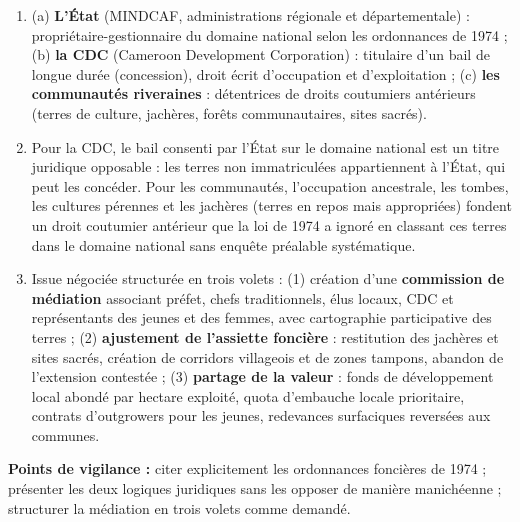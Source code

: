 \documentclass[11pt]{article}
\begin{document}
\begin{corrige}
\begin{enumerate}
    \item (a) \textbf{L'État} (MINDCAF, administrations régionale et départementale) : propriétaire-gestionnaire du domaine national selon les ordonnances de 1974 ; (b) \textbf{la CDC} (Cameroon Development Corporation) : titulaire d'un bail de longue durée (concession), droit écrit d'occupation et d'exploitation ; (c) \textbf{les communautés riveraines} : détentrices de droits coutumiers antérieurs (terres de culture, jachères, forêts communautaires, sites sacrés).
    \item Pour la CDC, le bail consenti par l'État sur le domaine national est un titre juridique opposable : les terres non immatriculées appartiennent à l'État, qui peut les concéder. Pour les communautés, l'occupation ancestrale, les tombes, les cultures pérennes et les jachères (terres en repos mais appropriées) fondent un droit coutumier antérieur que la loi de 1974 a ignoré en classant ces terres dans le domaine national sans enquête préalable systématique.
    \item Issue négociée structurée en trois volets : (1) création d'une \textbf{commission de médiation} associant préfet, chefs traditionnels, élus locaux, CDC et représentants des jeunes et des femmes, avec cartographie participative des terres ; (2) \textbf{ajustement de l'assiette foncière} : restitution des jachères et sites sacrés, création de corridors villageois et de zones tampons, abandon de l'extension contestée ; (3) \textbf{partage de la valeur} : fonds de développement local abondé par hectare exploité, quota d'embauche locale prioritaire, contrats d'outgrowers pour les jeunes, redevances surfaciques reversées aux communes.
\end{enumerate}
\textbf{Points de vigilance :} citer explicitement les ordonnances foncières de 1974 ; présenter les deux logiques juridiques sans les opposer de manière manichéenne ; structurer la médiation en trois volets comme demandé.
\end{corrige}
\end{document}
